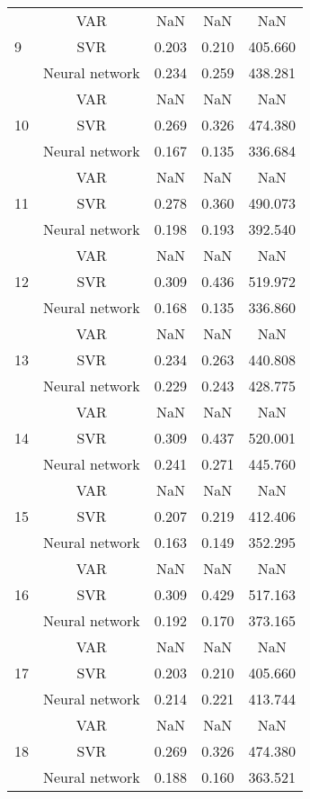 \documentclass[12pt]{article}
\begin{document}
\begin{longtable}{|p{2cm}|c|c|c|c|}
\cline{2-5}
\hline
\multirow{3}{*}{9} &VAR &   NaN &    NaN &    NaN\\
\cline{2-5}
 &SVR &   0.203 &    0.210 &    405.660\\
\cline{2-5}
 &Neural network &   0.234 &    0.259 &    438.281\\
\cline{2-5}
\hline
\multirow{3}{*}{10} &VAR &   NaN &    NaN &    NaN\\
\cline{2-5}
 &SVR &   0.269 &    0.326 &    474.380\\
\cline{2-5}
 &Neural network &   0.167 &    0.135 &    336.684\\
\cline{2-5}
\hline
\multirow{3}{*}{11} &VAR &   NaN &    NaN &    NaN\\
\cline{2-5}
 &SVR &   0.278 &    0.360 &    490.073\\
\cline{2-5}
 &Neural network &   0.198 &    0.193 &    392.540\\
\cline{2-5}
\hline
\multirow{3}{*}{12} &VAR &   NaN &    NaN &    NaN\\
\cline{2-5}
 &SVR &   0.309 &    0.436 &    519.972\\
\cline{2-5}
 &Neural network &   0.168 &    0.135 &    336.860\\
\cline{2-5}
\hline
\multirow{3}{*}{13} &VAR &   NaN &    NaN &    NaN\\
\cline{2-5}
 &SVR &   0.234 &    0.263 &    440.808\\
\cline{2-5}
 &Neural network &   0.229 &    0.243 &    428.775\\
\cline{2-5}
\hline
\multirow{3}{*}{14} &VAR &   NaN &    NaN &    NaN\\
\cline{2-5}
 &SVR &   0.309 &    0.437 &    520.001\\
\cline{2-5}
 &Neural network &   0.241 &    0.271 &    445.760\\
\cline{2-5}
\hline
\multirow{3}{*}{15} &VAR &   NaN &    NaN &    NaN\\
\cline{2-5}
 &SVR &   0.207 &    0.219 &    412.406\\
\cline{2-5}
 &Neural network &   0.163 &    0.149 &    352.295\\
\cline{2-5}
\hline
\multirow{3}{*}{16} &VAR &   NaN &    NaN &    NaN\\
\cline{2-5}
 &SVR &   0.309 &    0.429 &    517.163\\
\cline{2-5}
 &Neural network &   0.192 &    0.170 &    373.165\\
\cline{2-5}
\hline
\multirow{3}{*}{17} &VAR &   NaN &    NaN &    NaN\\
\cline{2-5}
 &SVR &   0.203 &    0.210 &    405.660\\
\cline{2-5}
 &Neural network &   0.214 &    0.221 &    413.744\\
\cline{2-5}
\hline
\multirow{3}{*}{18} &VAR &   NaN &    NaN &    NaN\\
\cline{2-5}
 &SVR &   0.269 &    0.326 &    474.380\\
\cline{2-5}
 &Neural network &   0.188 &    0.160 &    363.521\\
\cline{2-5}
\hline
\end{longtable}
\end{document}

